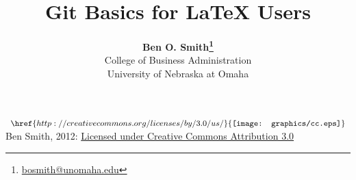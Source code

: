 \documentclass[11pt]{article}
\begin{document}
 

\title{Git Basics for LaTeX Users}
\date{}
\author{\textbf{Ben O. Smith\footnote{\href{mailto:bosmith@unomaha.edu}{bosmith@unomaha.edu}}} \\
College of Business Administration \\
University of Nebraska at Omaha}
\maketitle \doublespace







\vspace{\fill}
\noindent $ \begin{array}{l} \href{http://creativecommons.org/licenses/by/3.0/us/}{\texttt{[image: graphics/cc.eps]}} \end{array} $ Ben Smith, 2012: \href{http://creativecommons.org/licenses/by/3.0/us/}{Licensed under Creative Commons Attribution 3.0}
\end{document}
